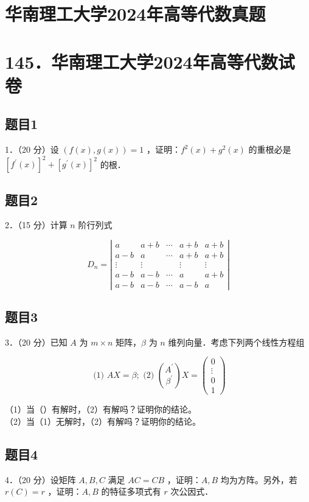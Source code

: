 \documentclass{article}
\begin{document}
\section*{华南理工大学2024年高等代数真题}
\section*{145．华南理工大学2024年高等代数试卷}

\subsection{题目1}
1．（20 分）设 \((f(x), g(x))=1\) ，证明：\(f^{2}(x)+g^{2}(x)\) 的重根必是 \(\left[f^{\prime}(x)\right]^{2}+\left[g^{\prime}(x)\right]^{2}\) 的根．

\subsection{题目2}
2．（15 分）计算 \(n\) 阶行列式

\[
D_{n}=\left|\begin{array}{ccccc}
a & a+b & \cdots & a+b & a+b \\
a-b & a & \cdots & a+b & a+b \\
\vdots & \vdots & & \vdots & \vdots \\
a-b & a-b & \cdots & a & a+b \\
a-b & a-b & \cdots & a-b & a
\end{array}\right|
\]

\subsection{题目3}
3．（20 分）已知 \(A\) 为 \(m \times n\) 矩阵，\(\beta\) 为 \(n\) 维列向量．考虑下列两个线性方程组

\[
\text { (1) } A X=\beta ; \text { (2) }\binom{A^{\prime}}{\beta^{\prime}} X=\left(\begin{array}{c}
0 \\
\vdots \\
0 \\
1
\end{array}\right)
\]

（1）当（）有解时，（2）有解吗？证明你的结论。\\
（2）当（1）无解时，（2）有解吗？证明你的结论。

\subsection{题目4}
4．（20 分）设矩阵 \(A, B, C\) 满足 \(A C=C B\) ，证明：\(A, B\) 均为方阵。另外，若 \(r(C)=r\) ，证明：\(A, B\) 的特征多项式有 \(r\) 次公因式．
\end{document}
